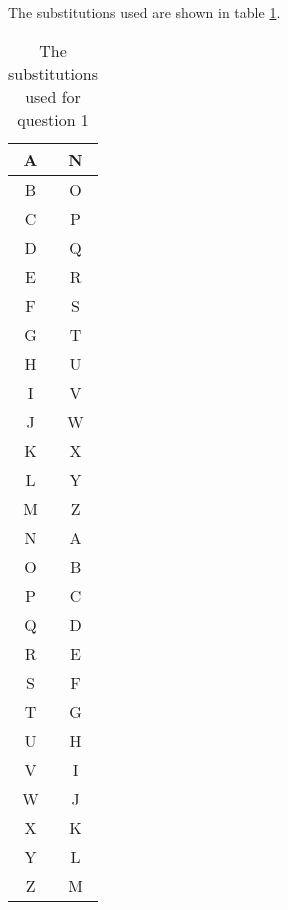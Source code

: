 The substitutions used are shown in table \ref{tab:sub1}.

\begin{table}[h]
	\centering
	\begin{tabular}[h]{| c | c |}
		\hline
		A	& N	\\ \hline
		B	& O	\\ \hline
		C	& P	\\ \hline
		D	& Q	\\ \hline
		E	& R	\\ \hline
		F	& S	\\ \hline
		G	& T	\\ \hline
		H	& U	\\ \hline
		I	& V	\\ \hline
		J	& W	\\ \hline
		K	& X	\\ \hline
		L	& Y	\\ \hline
		M	& Z	\\ \hline
		N	& A	\\ \hline
		O	& B	\\ \hline
		P	& C	\\ \hline
		Q	& D	\\ \hline
		R	& E	\\ \hline
		S	& F	\\ \hline
		T	& G	\\ \hline
		U	& H	\\ \hline
		V	& I	\\ \hline
		W	& J	\\ \hline
		X	& K	\\ \hline
		Y	& L	\\ \hline
		Z	& M	\\ \hline
	\end{tabular}
	\caption{The substitutions used for question 1}
	\label{tab:sub1}
\end{table}
